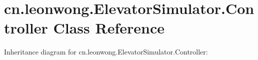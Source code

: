 \hypertarget{classcn_1_1leonwong_1_1_elevator_simulator_1_1_controller}{}\section{cn.\+leonwong.\+Elevator\+Simulator.\+Controller Class Reference}
\label{classcn_1_1leonwong_1_1_elevator_simulator_1_1_controller}


Inheritance diagram for cn.\+leonwong.\+Elevator\+Simulator.\+Controller\+:
